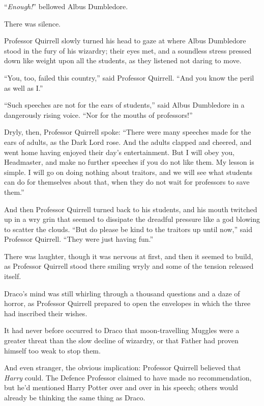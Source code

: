 “\emph{Enough!}” bellowed Albus Dumbledore.

There was silence.

Professor Quirrell slowly turned his head to gaze at where Albus Dumbledore stood in the fury of his wizardry; their eyes met, and a soundless stress pressed down like weight upon all the students, as they listened not daring to move.

“You, too, failed this country,” said Professor Quirrell. “And you know the peril as well as I.”

“Such speeches are not for the ears of students,” said Albus Dumbledore in a dangerously rising voice. “Nor for the mouths of professors!”

Dryly, then, Professor Quirrell spoke: “There were many speeches made for the ears of adults, as the Dark Lord rose. And the adults clapped and cheered, and went home having enjoyed their day’s entertainment. But I will obey you, Headmaster, and make no further speeches if you do not like them. My lesson is simple. I will go on doing nothing about traitors, and we will see what students can do for themselves about that, when they do not wait for professors to save them.”

And then Professor Quirrell turned back to his students, and his mouth twitched up in a wry grin that seemed to dissipate the dreadful pressure like a god blowing to scatter the clouds. “But do please be kind to the traitors up until now,” said Professor Quirrell. “They were just having fun.”

There was laughter, though it was nervous at first, and then it seemed to build, as Professor Quirrell stood there smiling wryly and some of the tension released itself.

\later

Draco’s mind was still whirling through a thousand questions and a daze of horror, as Professor Quirrell prepared to open the envelopes in which the three had inscribed their wishes.

It had never before occurred to Draco that moon-travelling Muggles were a greater threat than the slow decline of wizardry, or that Father had proven himself too weak to stop them.

And even stranger, the obvious implication: Professor Quirrell believed that \emph{Harry} could. The Defence Professor claimed to have made no recommendation, but he’d mentioned Harry Potter over and over in his speech; others would already be thinking the same thing as Draco.

